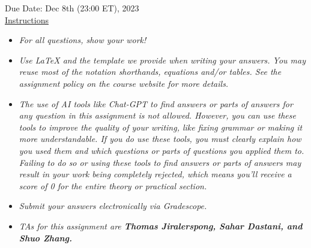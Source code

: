 \documentclass[12pt]{article}
\theoremstyle{definition}
\begin{document}
\fancyhead{}
\fancyfoot{}


\vspace{1cm}

\shorthandoff{:}
{Due Date: Dec 8th (23:00 ET), 2023}\\


\vspace{-0.5cm}
\underline{Instructions}%
\renewcommand{\labelitemi}{\textbullet}

\begin{itemize}
\item \emph{For all questions, show your work!}
\item \emph{Use LaTeX and the template we provide when writing your answers.
You may reuse most of the notation shorthands, equations and/or tables.
See the assignment policy on the course website for more details.}
\item \emph{The use of AI tools like Chat-GPT to find answers or parts of answers for any question in this assignment is not allowed. However, you can use these tools to improve the quality of your writing, like fixing grammar or making it more understandable. If you do use these tools, you must clearly explain how you used them and which questions or parts of questions you applied them to. Failing to do so or using these tools to find answers or parts of answers may result in your work being completely rejected, which means you'll receive a score of 0 for the entire theory or practical section.}
\item \emph{Submit your answers electronically via Gradescope.}
\item \emph{TAs for this assignment are \textbf{Thomas Jiralerspong, Sahar Dastani, and Shuo Zhang.}}
\end{itemize}
\end{document}
